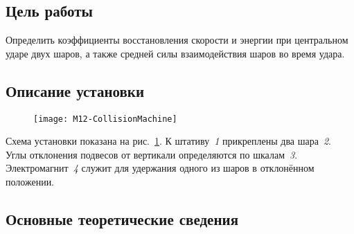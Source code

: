 \documentclass[a4paper, 12pt]{extarticle}
\begin{document}
\MTDTitlePage
\MTDInfoPage

\setcounter{section}{12}

\subsection{Цель работы}
Определить коэффициенты восстановления скорости и энергии при центральном ударе двух шаров, а также средней силы взаимодействия шаров во время удара.

\subsection{Описание установки}

\begin{figure}[H]
\centering
\texttt{[image: M12-CollisionMachine]}
\caption{\label{fig:m12-equipment}}
\end{figure}

Схема установки показана на рис.~\ref{fig:m12-equipment}. К штативу~\emph{1} прикреплены два шара~\emph{2}. Углы отклонения подвесов от вертикали определяются по шкалам~\emph{3}. Электромагнит~\emph{4} служит для удержания одного из шаров в отклонённом положении.

\subsection{Основные теоретические сведения}
\end{document}
